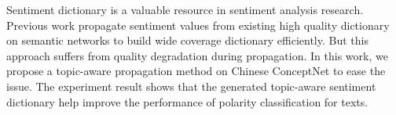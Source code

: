 Sentiment dictionary is a valuable resource in sentiment analysis research. Previous work propagate sentiment values from existing high quality dictionary on semantic networks to build wide coverage dictionary efficiently. But this approach suffers from quality degradation during propagation. In this work, we propose a topic-aware propagation method on Chinese ConceptNet to ease the issue. The experiment result shows that the generated topic-aware sentiment dictionary help improve the performance of polarity classification for texts.




